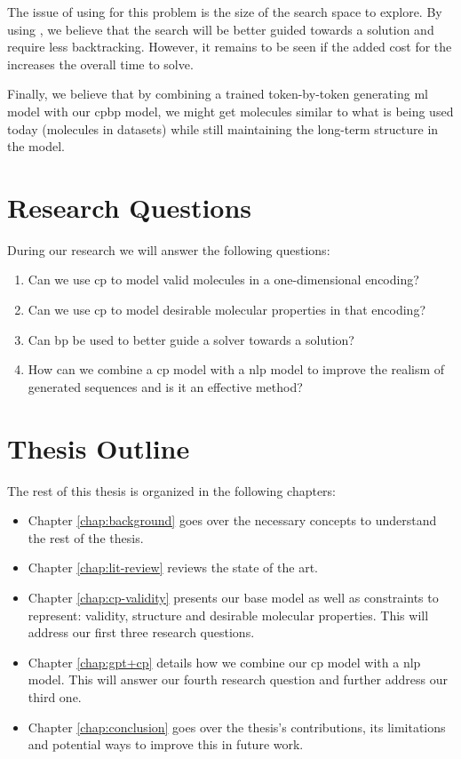 \documentclass[../Document.tex]{subfiles}
\begin{document}
The issue of using \cp for this problem is the size of the search space to explore. By using \bp, we believe that the search will be better guided towards a solution and require less backtracking. However, it remains to be seen if the added cost for the \bp increases the overall time to solve.

Finally, we believe that by combining a trained token-by-token generating \gls{ml} model with our \gls{cpbp} model, we might get molecules similar to what is being used today (molecules in datasets) while still maintaining the long-term structure in the \cp model.


\section{Research Questions}
\label{sec:intro/questions}
During our research we will answer the following questions:

\begin{enumerate}
    \item Can we use \acrshort{cp} to model valid molecules in a one-dimensional encoding?
    \item Can we use \acrshort{cp} to model desirable molecular properties in that encoding?
    \item Can \acrlong{bp} be used to better guide a solver towards a solution?
    \item How can we combine a \acrshort{cp} model with a \acrshort{nlp} model to improve the realism of generated sequences and is it an effective method?
\end{enumerate}

\section{Thesis Outline}
\label{sec:intro/outline}
The rest of this thesis is organized in the following chapters:

\begin{itemize}
    \item Chapter \ref{chap:background} goes over the necessary concepts to understand the rest of the thesis.
    \item Chapter \ref{chap:lit-review} reviews the state of the art.
    \item Chapter \ref{chap:cp-validity} presents our base \cp model as well as constraints to represent: validity, structure and desirable molecular properties. This will address our first three research questions.
    \item Chapter \ref{chap:gpt+cp} details how we combine our \acrshort{cp} model with a \acrshort{nlp} model. This will answer our fourth research question and further address our third one.
    \item Chapter \ref{chap:conclusion} goes over the thesis's contributions, its limitations and potential ways to improve this in future work.
\end{itemize}
\end{document}
